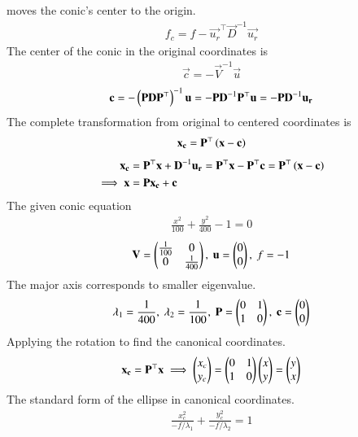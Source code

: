 \documentclass[journal]{IEEEtran}
\begin{document}
moves the conic's center to the origin.
\begin{align}
    f_c = f - \vec{u_r}^\top\vec{D}^{-1}\vec{u_r}
\end{align}
The center of the conic in the original coordinates is 
\begin{align}
    \vec{c} = -\vec{V}^{-1}\vec{u}
\end{align}
\begin{align}
    \mathbf{c} = -\left(\mathbf{P}\mathbf{D}\mathbf{P}^\top\right)^{-1}\mathbf{u} = -\mathbf{P}\mathbf{D}^{-1}\mathbf{P}^\top\mathbf{u} = -\mathbf{P}\mathbf{D}^{-1}\mathbf{u_r}
\end{align}
The complete transformation from original to centered coordinates is 
\begin{align}
    \mathbf{x_c} = \mathbf{P}^\top\left(\mathbf{x}-\mathbf{c}\right)
\end{align}
\begin{align}
    \mathbf{x_c} &= \mathbf{P}^\top\mathbf{x} + \mathbf{D}^{-1}\mathbf{u_r} = \mathbf{P}^\top\mathbf{x} - \mathbf{P}^\top\mathbf{c} = \mathbf{P}^\top\left(\mathbf{x}-\mathbf{c}\right) \\
    \implies \mathbf{x} &= \mathbf{P}\mathbf{x_c} + \mathbf{c} \label{eq:71}
\end{align}
The given conic equation
\begin{align}
    \frac{x^2}{100} + \frac{y^2}{400} - 1 = 0
\end{align}
\begin{align}
    \mathbf{V} = \begin{pmatrix}\frac{1}{100} & 0 \\ 0 & \frac{1}{400}\end{pmatrix}, \text{ } \mathbf{u} = \begin{pmatrix}0 \\ 0\end{pmatrix}, \text{ } f = -1
\end{align}
The major axis corresponds to smaller eigenvalue.
\begin{align}
    \lambda_1 = \frac{1}{400}, \text{ } \lambda_2 = \frac{1}{100}, \text{ } \mathbf{P} = \begin{pmatrix}0 & 1 \\ 1 & 0\end{pmatrix}, \text{ } \mathbf{c} = \begin{pmatrix}0 \\ 0\end{pmatrix}
\end{align}
Applying the rotation to find the canonical coordinates.
\begin{align}
    \mathbf{x_c} = \mathbf{P}^\top\mathbf{x} \implies \begin{pmatrix}x_c \\ y_c\end{pmatrix} = \begin{pmatrix}0 & 1 \\ 1 & 0\end{pmatrix}\begin{pmatrix}x \\ y\end{pmatrix} = \begin{pmatrix}y \\ x\end{pmatrix}
\end{align}
The standard form of the ellipse in canonical coordinates.
\begin{align}
    \frac{x_c^2}{-f/\lambda_1} + \frac{y_c^2}{-f/\lambda_2} = 1
\end{align}
\end{document}

